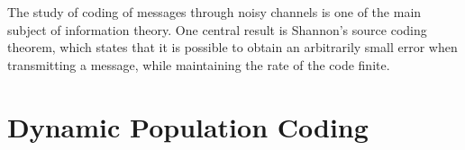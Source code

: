 The study of coding of messages through noisy channels is one of the main subject of information theory. One central result is Shannon's source coding theorem, which states that it is possible to obtain an arbitrarily small error when transmitting a message, while maintaining the rate of the code finite\cite{Cover1991}.
\section{Dynamic Population Coding}


